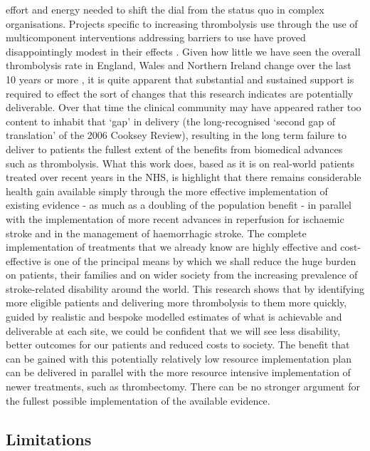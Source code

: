 effort and energy needed to shift the dial from the status quo in complex organisations. Projects specific to increasing thrombolysis use through the use of multicomponent interventions addressing barriers to use have proved disappointingly modest in their effects  \cite{scott_multilevel_2013}. Given how little we have seen the overall thrombolysis rate in England, Wales and Northern Ireland change over the last 10 years or more \cite{sentinel_national_stroke_audit_programme_ssnap_2023}, it is quite apparent that substantial and sustained support is required to effect the sort of changes that this research indicates are potentially deliverable. Over that time the clinical community may have appeared rather too content to inhabit that ‘gap’ in delivery (the long-recognised ‘second gap of translation’ of the 2006 Cooksey Review\cite{cooksey_review_2006}), resulting in the long term failure to deliver to patients the fullest extent of the benefits from biomedical advances such as thrombolysis. What this work does, based as it is on real-world patients treated over recent years in the NHS, is highlight that there remains considerable health gain available simply through the more effective implementation of existing evidence - as much as a doubling of the population benefit - in parallel with the implementation of more recent advances in reperfusion for ischaemic stroke and in the management of haemorrhagic stroke. The complete implementation of treatments that we already know are highly effective and cost-effective is one of the principal means by which we shall reduce the huge burden on patients, their families and on wider society from the increasing prevalence of stroke-related disability around the world. This research shows that by identifying more eligible patients and delivering more thrombolysis to them more quickly, guided by realistic and bespoke modelled estimates of what is achievable and deliverable at each site, we could be confident that we will see less disability, better outcomes for our patients and reduced costs to society. The benefit that can be gained with this potentially relatively low resource implementation plan can be delivered in parallel with the more resource intensive implementation of newer treatments, such as thrombectomy. There can be no stronger argument for the fullest possible implementation of the available evidence.

\subsection{Limitations}

